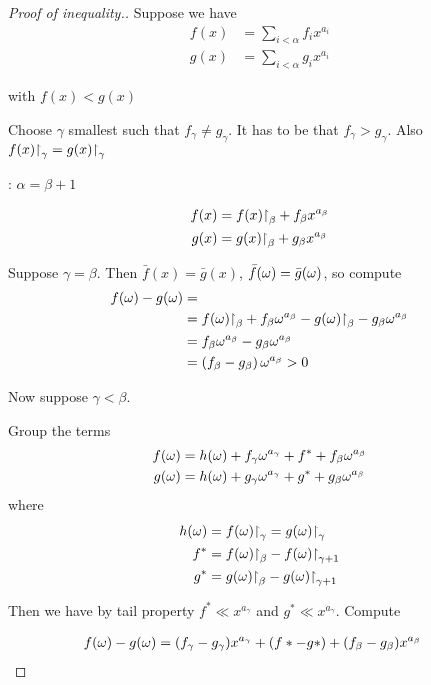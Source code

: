 \begin{proof}[Proof of inequality.] %

Suppose we have
\begin{align*}
  f(x) &= \sum_{i < \alpha} f_i x^{a_i} \\
  g(x) &= \sum_{i < \alpha} g_i x^{a_i}
\end{align*}

with $f(x) < g(x)$

Choose $\gamma$ smallest such that $f_\gamma \neq g_\gamma$.
It has to be that $f_\gamma > g_\gamma$. Also $f(x)\mathord{\upharpoonright}_{\gamma} = g(x)\mathord{\upharpoonright}_{\gamma}$

: $\alpha = \beta + 1$

\begin{align*}
  f(x) &= f(x)\mathord{\upharpoonright}_{\beta} + f_\beta x^{a_\beta}\\
  g(x) &= g(x)\mathord{\upharpoonright}_{\beta} + g_\beta x^{a_\beta}
\end{align*}

Suppose $\gamma = \beta$.
Then $\bar f(x) = \bar g(x)$, $\bar f(\omega) = \bar g(\omega)$, so compute
\begin{align*}
  f(\omega) - g(\omega) &= \\
	&= f(\omega)\mathord{\upharpoonright}_{\beta} + f_\beta \omega^{a_\beta} - g(\omega)\mathord{\upharpoonright}_{\beta} - g_\beta \omega^{a_\beta} \\
	&= f_\beta \omega^{a_\beta} - g_\beta \omega^{a_\beta} \\
	&= \left( f_\beta - g_\beta \right) \omega^{a_\beta} > 0
\end{align*}

Now suppose $\gamma < \beta$.

Group the terms
\begin{align*}
  f(\omega) &= h(\omega) + f_\gamma \omega^{a_\gamma} + f^* + f_\beta \omega^{a_\beta} \\
  g(\omega) &= h(\omega) + g_\gamma \omega^{a_\gamma} + g^* + g_\beta \omega^{a_\beta}
\end{align*}
where
\begin{align*}
	h(\omega) &= f(\omega)\mathord{\upharpoonright}_{\gamma} = g(\omega)\mathord{\upharpoonright}_{\gamma} \\
	f^* &= f(\omega)\mathord{\upharpoonright}_{\beta} - f(\omega)\mathord{\upharpoonright}_{\gamma + 1} \\
	g^* &= g(\omega)\mathord{\upharpoonright}_{\beta} - g(\omega)\mathord{\upharpoonright}_{\gamma + 1}
\end{align*}

Then we have by tail property $f^* \ll x^{a_\gamma}$ and $g^* \ll x^{a_\gamma}$. Compute

\begin{align*}
  f(\omega) - g(\omega) &= (f_\gamma - g_\gamma) x^{a_\gamma} + (f* - g*) + (f_\beta - g_\beta) x^{a_\beta}
\end{align*}


\end{proof}
